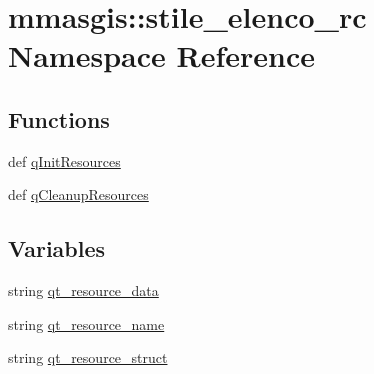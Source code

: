 \hypertarget{namespacemmasgis_1_1stile__elenco__rc}{
\section{mmasgis::stile\_\-elenco\_\-rc Namespace Reference}
\label{namespacemmasgis_1_1stile__elenco__rc}
}
\subsection*{Functions}
\begin{DoxyCompactItemize}
\item 
def \hyperlink{namespacemmasgis_1_1stile__elenco__rc_a4aa2d2e29395e6de81cb8a8f80724e08}{qInitResources}
\item 
def \hyperlink{namespacemmasgis_1_1stile__elenco__rc_a912cd70c2478a51854cd8d8951dcc940}{qCleanupResources}
\end{DoxyCompactItemize}
\subsection*{Variables}
\begin{DoxyCompactItemize}
\item 
string \hyperlink{namespacemmasgis_1_1stile__elenco__rc_aff5640756fcddaccc9a99b684f36469a}{qt\_\-resource\_\-data}
\item 
string \hyperlink{namespacemmasgis_1_1stile__elenco__rc_adfe643745bf06dba0088376da94b9bf3}{qt\_\-resource\_\-name}
\item 
string \hyperlink{namespacemmasgis_1_1stile__elenco__rc_a33613c1931dca622729d8edbee726e06}{qt\_\-resource\_\-struct}
\end{DoxyCompactItemize}


